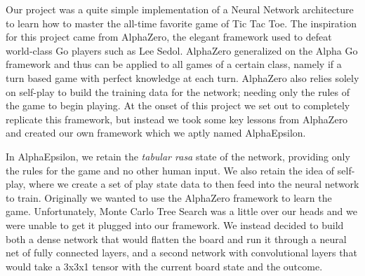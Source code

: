 

Our project was a quite simple implementation of a Neural Network architecture to learn how to master the all-time favorite game of Tic Tac Toe.
The inspiration for this project came from AlphaZero, the elegant framework used to defeat world-class Go players such as Lee Sedol.
AlphaZero generalized on the Alpha Go framework and thus can be applied to all games of a certain class, namely if a turn based game with perfect knowledge at each turn.
AlphaZero also relies solely on self-play to build the training data for the network;
needing only the rules of the game to begin playing.
At the onset of this project we set out to completely replicate this framework, but instead we took some key lessons from AlphaZero and created our own framework which we aptly named AlphaEpsilon.

In AlphaEpsilon, we retain the \textit{tabular rasa} state of the network, providing only the rules for the game and no other human input.
We also retain the idea of self-play, where we create a set of play state data to then feed into the neural network to train.
Originally we wanted to use the AlphaZero framework to learn the game.
Unfortunately, Monte Carlo Tree Search was a little over our heads and we were unable to get it plugged into our framework.
We instead decided to build both a dense network that would flatten the board and run it through a neural net of fully connected layers, and a second network with convolutional layers that would take a 3x3x1 tensor with the current board state and the outcome.
